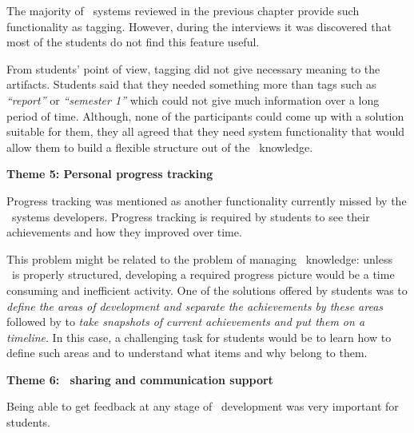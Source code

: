 The majority of \ep~systems reviewed in the previous chapter provide such
functionality as tagging. However, during the interviews it was discovered that
most of the students do not find this feature useful.


From students' point of view, tagging did not give necessary meaning to the
artifacts. Students said that they needed something more than tags such as
\textit{``report''} or \textit{``semester 1''} which could not give much
information over a long period of time. Although, none of the participants could
come up with a solution suitable for them, they all agreed that they need system
functionality that would allow them to build a flexible structure out of the
\ep~knowledge.

\textbf{Theme 5: Personal progress tracking}

Progress tracking was mentioned as another functionality currently missed by the
\ep~systems developers. Progress tracking is required by students to see their
achievements and how they improved over time.


This problem might be related to the problem of managing \ep~knowledge: unless
\ep~is properly structured, developing a required progress picture would be a
time consuming and inefficient activity. One of the solutions offered by
students was to \textit{define the areas of development and separate the
achievements by these areas} followed by to \textit{take snapshots of current
achievements and put them on a timeline}. In this case, a challenging task for
students would be to learn how to define such areas and to understand what
items and why belong to them.

\textbf{Theme 6: \ep~sharing and communication support}

Being able to get feedback at any stage of \ep~development was very important
for students.


